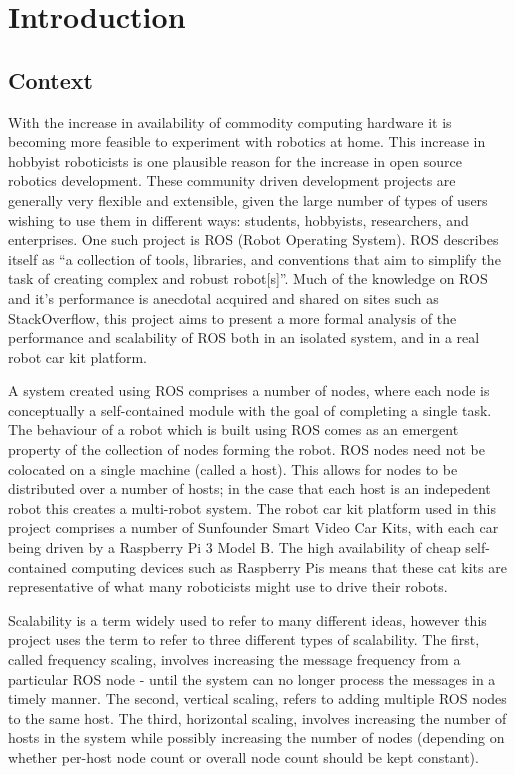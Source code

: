 \documentclass[../dissertation.tex]{subfiles}
\begin{document}
\chapter{Introduction}
\label{introduction-chapter}

\section{Context}

With the increase in availability of commodity computing hardware it is becoming more feasible to experiment with robotics at home. This increase in hobbyist roboticists is one plausible reason for the increase in open source robotics development. These community driven development projects are generally very flexible and extensible, given the large number of types of users wishing to use them in different ways: students, hobbyists, researchers, and enterprises. One such project is ROS (Robot Operating System). ROS describes itself as ``a collection of tools, libraries, and conventions that aim to simplify the task of creating complex and robust robot[s]''\cite{rosaboutpage}. Much of the knowledge on ROS and it's performance is anecdotal acquired and shared on sites such as StackOverflow, this project aims to present a more formal analysis of the performance and scalability of ROS both in an isolated system, and in a real robot car kit platform.

A system created using ROS comprises a number of nodes, where each node is conceptually a self-contained module with the goal of completing a single task. The behaviour of a robot which is built using ROS comes as an emergent property of the collection of nodes forming the robot. ROS nodes need not be colocated on a single machine (called a host). This allows for nodes to be distributed over a number of hosts; in the case that each host is an indepedent robot this creates a multi-robot system. The robot car kit platform used in this project comprises a number of Sunfounder Smart Video Car Kits\cite{SunfounderRobotCarKit}, with each car being driven by a Raspberry Pi 3 Model B. The high availability of cheap self-contained computing devices such as Raspberry Pis means that these cat kits are representative of what many roboticists might use to drive their robots.

Scalability is a term widely used to refer to many different ideas, however this project uses the term to refer to three different types of scalability. The first, called frequency scaling, involves increasing the message frequency from a particular ROS node - until the system can no longer process the messages in a timely manner. The second, vertical scaling, refers to adding multiple ROS nodes to the same host. The third, horizontal scaling, involves increasing the number of hosts in the system while possibly increasing the number of nodes (depending on whether per-host node count or overall node count should be kept constant).
\end{document}
